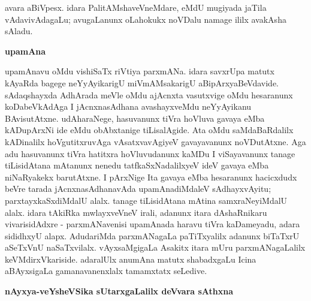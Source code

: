 avara aBiVpesx. idara PalitAMshaveVneMdare, eMdU mugiyada jaTila vAdavivAdagaLu; avugaLanunx oLa\-hokukx noVDalu namage ililx avakAsha sAladu.

\bigskip
\begin{center}
{\Large\bf upamAna}
\end{center}

upamAnavu oMdu vishiSaTx riVtiya parxmANa. idara savxrUpa matutx kAyaRda bagege neYyAyikarigU miVmAMsakarigU aBipArxyaBeVdavide. sAdaqshayxda AdhArada meVle oMdu ajAcnxta vasutxvige oMdu hesaranunx koDabeVkAdAga I jAcnxnasAdhana avashayxveMdu neYyAyikanu BAvisutAtxne. udAharaNege, hasuvanunx tiVra hoVluva gavaya eMba kADupArxNi ide eMdu obAbxtanige tiLisalAgide. Ata oMdu saMdaBaRdalilx kADinalilx hoVgutitxruvAga vAsatxvavAgiyeV gavayavanunx noVDutAtxne. Aga adu hasuvanunx tiVra hatitxra hoVluvudanunx kaMDu I viSayavanunx tanage tiLisidAtana mAtanunx nenedu tatfkaSxNadalilxyeV ideV gavaya eMba niNaRyakekx barutAtxne. I pArxNige Ita gavaya eMba hesaranunx hacicxdudx beVre tarada jAcnxnasAdhanavAda upamAnadiMdaleV sAdhayxvAyitu; parxtayxkaSxdiMdalU alalx. tanage tiLisidAtana mAtina samxraNeyiMdalU alalx. idara tAkiRka mwlayxveVneV irali, adanunx itara dAshaRnikaru vivarisidAdxre - parxmANavenisi upamAnada haravu tiVra kaDameyadu, adara sididhxyU alapx. AdudariMda parxmANagaLa paTiTxyalilx adanunx biTaTxrU aSeTxVnU naSaTxvilalx. vAyxsaMgigaLa Asakitx itara mUru parxmANagaLalilx keVMdirxVkariside. adaralUlx anumAna matutx shabadxgaLu Icina aBAyxsigaLa gamanavanenxlalx tamamxtatx seLedive.

\bigskip
\begin{center}
{\Large\bf nAyxya-veYsheVSika sUtarxgaLalilx deVvara sAthxna}
\end{center}

